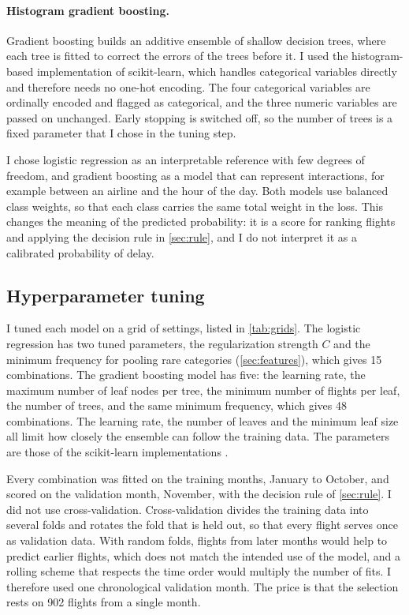 \paragraph{Histogram gradient boosting.} Gradient boosting builds an additive ensemble of shallow decision trees, where each tree is fitted to correct the errors of the trees before it. I used the histogram-based implementation of scikit-learn, which handles categorical variables directly and therefore needs no one-hot encoding. The four categorical variables are ordinally encoded and flagged as categorical, and the three numeric variables are passed on unchanged. Early stopping is switched off, so the number of trees is a fixed parameter that I chose in the tuning step.

I chose logistic regression as an interpretable reference with few degrees of freedom, and gradient boosting as a model that can represent interactions, for example between an airline and the hour of the day. Both models use balanced class weights, so that each class carries the same total weight in the loss. This changes the meaning of the predicted probability: it is a score for ranking flights and applying the decision rule in \cref{sec:rule}, and I do not interpret it as a calibrated probability of delay.

\subsection{Hyperparameter tuning}\label{sec:tuning}

I tuned each model on a grid of settings, listed in \cref{tab:grids}. The logistic regression has two tuned parameters, the regularization strength $C$ and the minimum frequency for pooling rare categories (\cref{sec:features}), which gives 15 combinations. The gradient boosting model has five: the learning rate, the maximum number of leaf nodes per tree, the minimum number of flights per leaf, the number of trees, and the same minimum frequency, which gives 48 combinations. The learning rate, the number of leaves and the minimum leaf size all limit how closely the ensemble can follow the training data. The parameters are those of the scikit-learn implementations \citep{pedregosa2011scikit}.



Every combination was fitted on the training months, January to October, and scored on the validation month, November, with the decision rule of \cref{sec:rule}. I did not use cross-validation. Cross-validation divides the training data into several folds and rotates the fold that is held out, so that every flight serves once as validation data. With random folds, flights from later months would help to predict earlier flights, which does not match the intended use of the model, and a rolling scheme that respects the time order would multiply the number of fits. I therefore used one chronological validation month. The price is that the selection rests on 902 flights from a single month.

